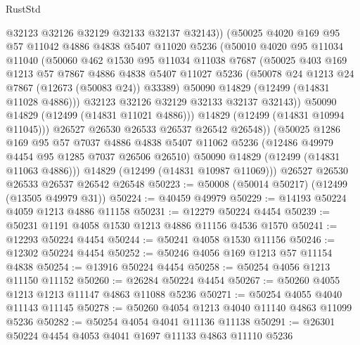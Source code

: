 \begin{lexlean}{RustStd}
\begin{coremodule}
{\begin{coremodule}
{{{{{{{{{{{{{{{{{{{{{{{{{{{{{{{{{{{{{{{{{{{{{{{{{{{{{{{{{{{{{{{{{{{{{{{{{{{{{{{{                @32123
                @32126
                @32129
                @32133
                @32137
                @32143))
            (@50025
              @4020
              @169
              @95
              @57
              @11042
              @4886
              @4838
              @5407
              @11020
              @5236
              (@50010
                @4020
                @95
                @11034
                @11040
                (@50060
                  @462
                  @1530
                  @95
                  @11034
                  @11038
                  @7687
                  (@50025
                    @403
                    @169
                    @1213
                    @57
                    @7867
                    @4886
                    @4838
                    @5407
                    @11027
                    @5236
                    (@50078 @24 @1213 @24 @7867 (@12673 (@50083 @24)) @33389)
                    @50090
                    @14829
                    (@12499 (@14831 @11028 @4886)))
                  @32123
                  @32126
                  @32129
                  @32133
                  @32137
                  @32143))
              @50090
              @14829
              (@12499 (@14831 @11021 @4886)))
            @14829
            (@12499 (@14831 @10994 @11045)))
          @26527
          @26530
          @26533
          @26537
          @26542
          @26548))
      (@50025
        @1286
        @169
        @95
        @57
        @7037
        @4886
        @4838
        @5407
        @11062
        @5236
        (@12486 @49979 @4454 @95 @1285 @7037 @26506 @26510)
        @50090
        @14829
        (@12499 (@14831 @11063 @4886)))
      @14829
      (@12499 (@14831 @10987 @11069)))
    @26527
    @26530
    @26533
    @26537
    @26542
    @26548
@50223 := @50008 (@50014 @50217) (@12499 (@13505 @49979 @31))
@50224 := @40459 @49979
@50229 := @14193 @50224 @4059 @1213 @4886 @11158
@50231 := @12279 @50224 @4454
@50239 := @50231 @1191 @4058 @1530 @1213 @4886 @11156 @4536 @1570
@50241 := @12293 @50224 @4454
@50244 := @50241 @4058 @1530 @11156
@50246 := @12302 @50224 @4454
@50252 := @50246 @4056 @169 @1213 @57 @11154 @4838
@50254 := @13916 @50224 @4454
@50258 := @50254 @4056 @1213 @11150 @11152
@50260 := @26284 @50224 @4454
@50267 := @50260 @4055 @1213 @1213 @11147 @4863 @11088 @5236
@50271 := @50254 @4055 @4040 @11143 @11145
@50278 := @50260 @4054 @1213 @4040 @11140 @4863 @11099 @5236
@50282 := @50254 @4054 @4041 @11136 @11138
@50291 := @26301 @50224 @4454 @4053 @4041 @1697 @11133 @4863 @11110 @5236
}}}}}}}}}}}}}}}}}}}}}}}}}}}}}}}}}}}}}}}}}}}}}}}}}}}}}}}}}}}}}}}}}}}}}}}}}}}}}}}}
\end{coremodule}}
\end{coremodule}
\end{lexlean}
